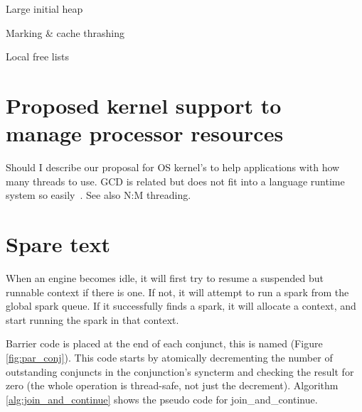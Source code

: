 Large initial heap

Marking \& cache thrashing

Local free lists

\section{Proposed kernel support to manage processor resources}

    
Should I describe our proposal for OS kernel's to help
applications with how many threads to use.
GCD is related but does not fit into a language runtime system so
easily~\cite{apple_gcd}.
See also N:M threading.

\section{Spare text}


%
%

When an engine becomes idle, it will first try
to resume a suspended but runnable context if there is one.
If not, it will attempt to run a spark from the global spark queue.
If it successfully finds a spark, it will allocate a context,
and start running the spark in that context.


Barrier code is placed at the end of each conjunct,
this is named  (Figure \ref{fig:par_conj}).
This code starts by atomically decrementing the number of outstanding
conjuncts in the conjunction's syncterm and checking the result for zero
(the whole operation is thread-safe, not just the decrement).
Algorithm \ref{alg:join_and_continue} shows the pseudo code for
join\_and\_continue.


